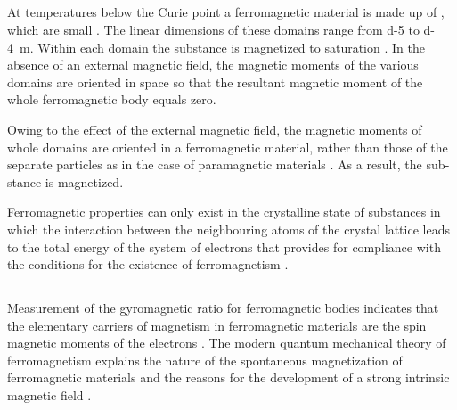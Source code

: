 \subsection{}\label{26.5.4} At temperatures below the Curie point  a ferromagnetic material is made up of , which are small . The linear dimensions of these domains range from \num{d-5} to \SI{d-4}{\meter}. Within each domain the substance is magnetized to saturation . In the absence of an external magnetic field, the magnetic moments of the various domains are oriented in space so that the resultant magnetic moment of the whole ferromagnetic body equals zero.

Owing to the effect of the external magnetic field, the magnetic moments of whole domains are oriented in a ferromagnetic material, rather than those of the separate particles as in the case of paramagnetic materials . As a result, the sub­ stance is magnetized.

Ferromagnetic properties can only exist in the crystalline state of substances in which the interaction between the neighbouring atoms of the crystal lattice leads to the total energy of the system of electrons that provides for compliance with the conditions for the existence of ferromagnetism .

\subsection{}\label{26.5.5} Measurement of the gyromagnetic ratio  for ferromagnetic bodies indicates that the elementary carriers of magnetism in ferromagnetic materials are the spin magnetic moments of the electrons . The modern quantum mechanical theory of ferromagnetism explains the nature of the spontaneous magnetization of ferromagnetic materials  and the reasons for the development of a strong intrinsic magnetic field .


